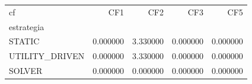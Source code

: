 \begin{tabular}{lrrrr}
\toprule
cf & CF1 & CF2 & CF3 & CF5 \\
estrategia &  &  &  &  \\
\midrule
STATIC & 0.000000 & 3.330000 & 0.000000 & 0.000000 \\
UTILITY_DRIVEN & 0.000000 & 3.330000 & 0.000000 & 0.000000 \\
SOLVER & 0.000000 & 0.000000 & 0.000000 & 0.000000 \\
\bottomrule
\end{tabular}

